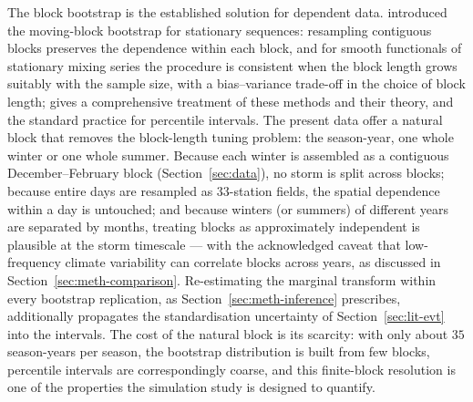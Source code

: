 The block bootstrap is the established solution for dependent data. \citet{kuensch1989} introduced the moving-block bootstrap for stationary sequences: resampling contiguous blocks preserves the dependence within each block, and for smooth functionals of stationary mixing series the procedure is consistent when the block length grows suitably with the sample size, with a bias--variance trade-off in the choice of block length; \citet{lahiri2003} gives a comprehensive treatment of these methods and their theory, and \citet{davisonhinkley1997} the standard practice for percentile intervals. The present data offer a natural block that removes the block-length tuning problem: the season-year, one whole winter or one whole summer. Because each winter is assembled as a contiguous December--February block (Section~\ref{sec:data}), no storm is split across blocks; because entire days are resampled as \(33\)-station fields, the spatial dependence within a day is untouched; and because winters (or summers) of different years are separated by months, treating blocks as approximately independent is plausible at the storm timescale --- with the acknowledged caveat that low-frequency climate variability can correlate blocks across years, as discussed in Section~\ref{sec:meth-comparison}. Re-estimating the marginal transform within every bootstrap replication, as Section~\ref{sec:meth-inference} prescribes, additionally propagates the standardisation uncertainty of Section~\ref{sec:lit-evt} into the intervals. The cost of the natural block is its scarcity: with only about \(35\) season-years per season, the bootstrap distribution is built from few blocks, percentile intervals are correspondingly coarse, and this finite-block resolution is one of the properties the simulation study is designed to quantify.

